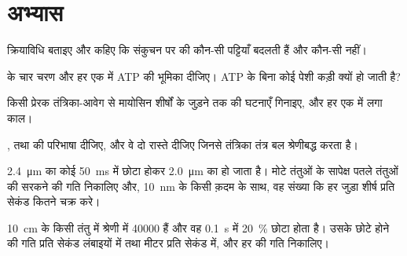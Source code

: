 \section{अभ्यास}

\begin{exercise}[$\star$]\label{exo:b2:muscle-movement:1}
 क्रियाविधि बताइए और कहिए कि संकुचन पर  की
कौन-सी पट्टियाँ बदलती हैं और कौन-सी नहीं।
\end{exercise}

\begin{exercise}[$\star$]\label{exo:b2:muscle-movement:2}
 के चार चरण और हर एक में ATP की भूमिका
दीजिए। ATP के बिना कोई पेशी कड़ी क्यों हो जाती है?
\end{exercise}

\begin{exercise}[$\star$]\label{exo:b2:muscle-movement:3}
किसी प्रेरक तंत्रिका-आवेग से मायोसिन शीर्षों के जुड़ने तक की घटनाएँ
गिनाइए, और हर एक में लगा काल।
\end{exercise}

\begin{exercise}[$\star$]\label{exo:b2:muscle-movement:4}
,  तथा  की परिभाषा दीजिए, और वे दो रास्ते दीजिए जिनसे
तंत्रिका तंत्र बल श्रेणीबद्ध करता है।
\end{exercise}

\begin{exercise}[$\star\star$]\label{exo:b2:muscle-movement:5}
\qty{2.4}{\micro m} का कोई  \qty{50}{ms} में छोटा होकर
\qty{2.0}{\micro m} का हो जाता है। मोटे तंतुओं के सापेक्ष पतले तंतुओं की
सरकने की गति निकालिए और, \qty{10}{nm} के किसी क़दम के साथ, वह संख्या
कि हर जुड़ा शीर्ष प्रति सेकंड कितने चक्र करे।
\end{exercise}

\begin{exercise}[$\star\star$]\label{exo:b2:muscle-movement:6}
\qty{10}{cm} के किसी तंतु में श्रेणी में \num{40000}  हैं और वह
\qty{0.1}{s} में \qty{20}{\%} छोटा होता है। उसके छोटे होने की गति
प्रति सेकंड लंबाइयों में तथा मीटर प्रति सेकंड में, और हर
 की गति निकालिए।
\end{exercise}

